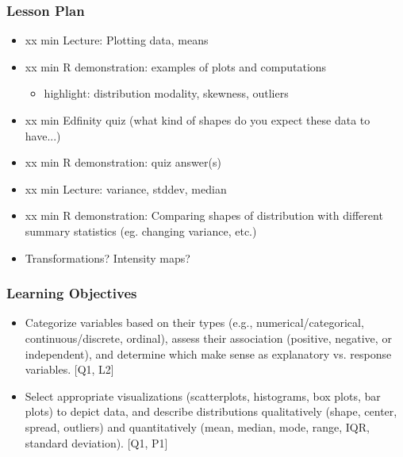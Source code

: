 \begin{frame}
    \frametitle{Lesson Plan}
    \begin{itemize}
        \item xx min Lecture: Plotting data, means
        \item xx min R demonstration: examples of plots and computations
        \begin{itemize}
            \item  highlight: distribution modality, skewness, outliers
        \end{itemize}
        \item xx min Edfinity quiz (what kind of shapes do you expect these data to have...)
        \item xx min R demonstration: quiz answer(s)
        \item xx min Lecture: variance, stddev, median
        \item xx min R demonstration: Comparing shapes of distribution with different summary statistics (eg. changing variance, etc.)
        \item Transformations? Intensity maps?
    \end{itemize}
    \end{frame}
    
    \begin{frame}
    \frametitle{Learning Objectives}
    \begin{itemize}
        \item Categorize variables based on their types (e.g., numerical/categorical, continuous/discrete, ordinal), assess their association (positive, negative, or independent), and determine which make sense as explanatory vs. response variables. [Q1, L2]
        \item Select appropriate visualizations (scatterplots, histograms, box plots, bar plots) to depict data, and describe distributions qualitatively (shape, center, spread, outliers) and quantitatively (mean, median, mode, range, IQR, standard deviation). [Q1, P1] 
    \end{itemize}
    \end{frame}